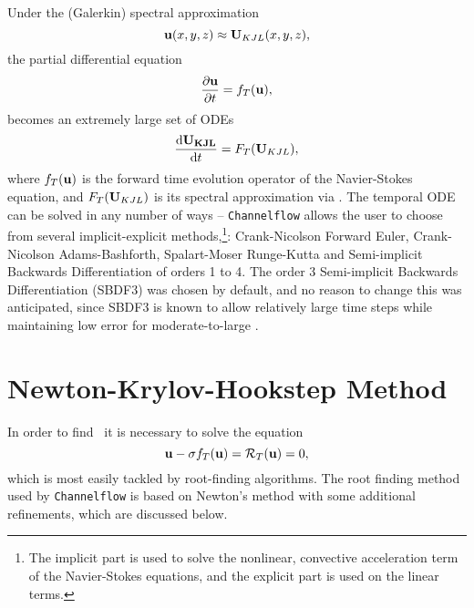 Under the (Galerkin) spectral approximation 
\begin{equation}
\mathbf{u}(x,y,z) \approx \mathbf{U}_{KJL}(x,y,z),
\end{equation}
the partial differential equation
\begin{equation}
\pder{1}{\Vector{u}}{t} = f_T(\Vector{u}),
\end{equation}
becomes an extremely large set of ODEs
\begin{equation}
\der{1}{\Vector{U_{KJL}}}{t} = F_T(\Vector{U}_{KJL}), 
\end{equation}
where $f_T(\mathbf{u})$ is the forward time evolution operator of the Navier-Stokes equation, and $F_T(\mathbf{U}_{KJL})$ is its spectral approximation via . The temporal ODE can be solved in any number of ways -- {\tt Channelflow} allows the user to choose from several implicit-explicit methods,\footnote{The implicit part is used to solve the nonlinear, convective acceleration term of the Navier-Stokes equations, and the explicit part is used on the linear terms.}: Crank-Nicolson Forward Euler, Crank-Nicolson Adams-Bashforth, Spalart-Moser Runge-Kutta and Semi-implicit Backwards Differentiation of orders 1 to 4. The order 3 Semi-implicit Backwards Differentiation (SBDF3) was chosen by default, and no reason to change this was anticipated, since SBDF3 is known to allow relatively large time steps while maintaining low error for moderate-to-large \ReN{}.

\section{Newton-Krylov-Hookstep Method}

In order to find \ecs\, it is necessary to solve the equation
\begin{equation}\label{eq:NRResidual}
\mathbf{u} - \sigma f_T(\mathbf{u}) = \mathcal{R}_T(\mathbf{u}) = 0,
\end{equation}
which is most easily tackled by root-finding algorithms. The root finding method used by {\tt Channelflow} is based on Newton's method with some additional refinements, which are discussed below. \\
